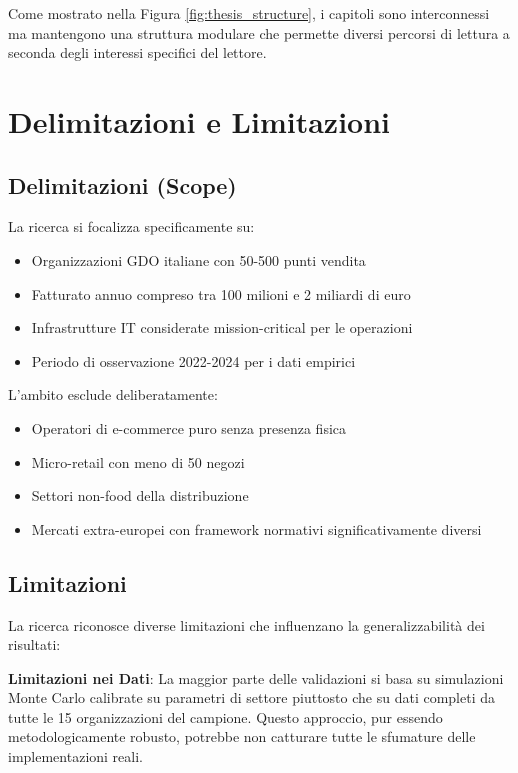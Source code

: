Come mostrato nella Figura \ref{fig:thesis_structure}, i capitoli sono interconnessi ma mantengono una struttura modulare che permette diversi percorsi di lettura a seconda degli interessi specifici del lettore.

\section{Delimitazioni e Limitazioni}

\subsection{Delimitazioni (Scope)}

La ricerca si focalizza specificamente su:
\begin{itemize}
\item Organizzazioni GDO italiane con 50-500 punti vendita
\item Fatturato annuo compreso tra 100 milioni e 2 miliardi di euro
\item Infrastrutture IT considerate mission-critical per le operazioni
\item Periodo di osservazione 2022-2024 per i dati empirici
\end{itemize}

L'ambito esclude deliberatamente:
\begin{itemize}
\item Operatori di e-commerce puro senza presenza fisica
\item Micro-retail con meno di 50 negozi
\item Settori non-food della distribuzione
\item Mercati extra-europei con framework normativi significativamente diversi
\end{itemize}

\subsection{Limitazioni}

La ricerca riconosce diverse limitazioni che influenzano la generalizzabilità dei risultati:

\textbf{Limitazioni nei Dati}: La maggior parte delle validazioni si basa su simulazioni Monte Carlo calibrate su parametri di settore piuttosto che su dati completi da tutte le 15 organizzazioni del campione. Questo approccio, pur essendo metodologicamente robusto, potrebbe non catturare tutte le sfumature delle implementazioni reali.

